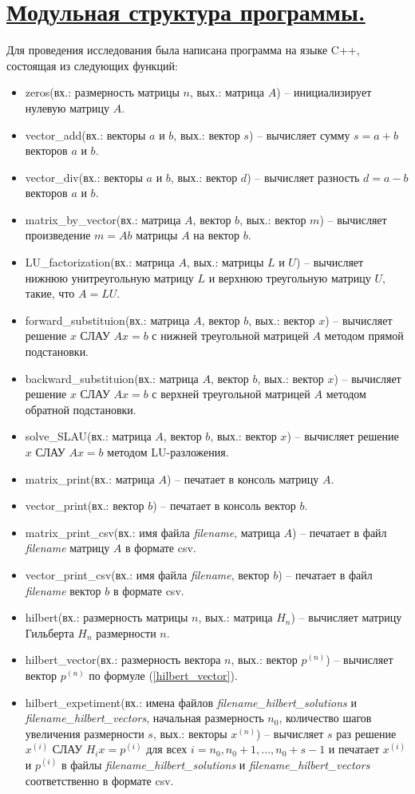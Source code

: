 \documentclass[a4paper, 12pt]{article}
\begin{document}
	\section{\underline{Модульная структура программы.}}
	Для проведения исследования была написана программа на языке C++, состоящая из следующих функций:
	\begin{itemize}
		\item zeros(вх.: размерность матрицы $n$, вых.: матрица $A$) -- инициализирует нулевую матрицу $A$.
		\item vector\_add(вх.: векторы $a$ и $b$, вых.: вектор $s$) -- вычисляет сумму $s=a+b$ векторов $a$ и $b$.
		\item vector\_div(вх.: векторы $a$ и $b$, вых.: вектор $d$) -- вычисляет разность $d=a-b$ векторов $a$ и $b$.
		\item matrix\_by\_vector(вх.: матрица $A$, вектор $b$, вых.: вектор $m$) -- вычисляет произведение $m=Ab$ матрицы $A$ на вектор $b$.
		\item LU\_factorization(вх.: матрица $A$, вых.: матрицы $L$ и $U$) -- вычисляет нижнюю унитреугольную матрицу $L$ и верхнюю треугольную матрицу $U$, такие, что $A=LU$.
		\item forward\_substituion(вх.: матрица $A$, вектор $b$, вых.: вектор $x$) -- вычисляет решение $x$ СЛАУ $Ax=b$ с нижней треугольной матрицей $A$ методом прямой подстановки.
		\item backward\_substituion(вх.: матрица $A$, вектор $b$, вых.: вектор $x$) -- вычисляет решение $x$ СЛАУ $Ax=b$ с верхней треугольной матрицей $A$ методом обратной подстановки.
		\item solve\_SLAU(вх.: матрица $A$, вектор $b$, вых.: вектор $x$) -- вычисляет решение $x$ СЛАУ $Ax=b$ методом LU-разложения.
		\item matrix\_print(вх.: матрица $A$) -- печатает в консоль матрицу $A$.
		\item vector\_print(вх.: вектор $b$) -- печатает в консоль вектор $b$.
		\item matrix\_print\_csv(вх.: имя файла \textit{filename}, матрица $A$) -- печатает в файл \textit{filename} матрицу $A$ в формате csv.
		\item vector\_print\_csv(вх.: имя файла \textit{filename}, вектор $b$) -- печатает в файл \textit{filename} вектор $b$ в формате csv.
		\item hilbert(вх.: размерность матрицы $n$, вых.: матрица $H_n$) -- вычисляет матрицу Гильберта $H_n$ размерности $n$.
		\item hilbert\_vector(вх.: размерность вектора $n$, вых.: вектор $p^{(n)}$) -- вычисляет вектор $p^{(n)}$ по формуле (\ref{hilbert_vector}).
		\item hilbert\_expetiment(вх.: имена файлов \textit{filename\_hilbert\_solutions} и \textit{filename\_hilbert\_vectors}, начальная размерность $n_0$, количество шагов увеличения размерности $s$, вых.: векторы $x^{(n)}$) -- вычисляет $s$ раз решение $x^{(i)}$ СЛАУ $H_ix=p^{(i)}$ для всех $i=n_0,n_0+1,...,n_0+s-1$ и печатает $x^{(i)}$ и $p^{(i)}$ в файлы \textit{filename\_hilbert\_solutions} и \textit{filename\_hilbert\_vectors} соответственно в формате csv.
	\end{itemize}
	
\end{document}
